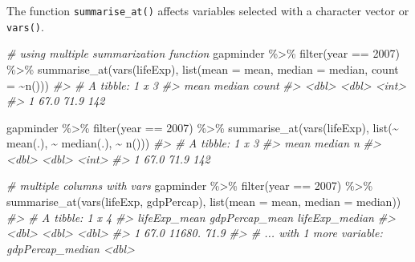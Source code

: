 \documentclass[
]{book}
\newenvironment{Shaded}{\begin{snugshade}}{\end{snugshade}}
\newcommand{\AttributeTok}[1]{\textcolor[rgb]{0.77,0.63,0.00}{#1}}
\newcommand{\CommentTok}[1]{\textcolor[rgb]{0.56,0.35,0.01}{\textit{#1}}}
\newcommand{\DecValTok}[1]{\textcolor[rgb]{0.00,0.00,0.81}{#1}}
\newcommand{\FunctionTok}[1]{\textcolor[rgb]{0.00,0.00,0.00}{#1}}
\newcommand{\NormalTok}[1]{#1}
\newcommand{\SpecialCharTok}[1]{\textcolor[rgb]{0.00,0.00,0.00}{#1}}
\begin{document}
The function \texttt{summarise\_at()} affects variables selected with a character vector or \texttt{vars()}.

\begin{Shaded}
\begin{Highlighting}[]
\CommentTok{\# using multiple summarization function}
\NormalTok{gapminder }\SpecialCharTok{\%\textgreater{}\%}
  \FunctionTok{filter}\NormalTok{(year }\SpecialCharTok{==} \DecValTok{2007}\NormalTok{) }\SpecialCharTok{\%\textgreater{}\%}
  \FunctionTok{summarise\_at}\NormalTok{(}\FunctionTok{vars}\NormalTok{(lifeExp), }\FunctionTok{list}\NormalTok{(}\AttributeTok{mean =}\NormalTok{ mean, }\AttributeTok{median =}\NormalTok{ median, }\AttributeTok{count =} \SpecialCharTok{\textasciitilde{}}\FunctionTok{n}\NormalTok{()))}
\CommentTok{\#\textgreater{} \# A tibble: 1 x 3}
\CommentTok{\#\textgreater{}    mean median count}
\CommentTok{\#\textgreater{}   \textless{}dbl\textgreater{}  \textless{}dbl\textgreater{} \textless{}int\textgreater{}}
\CommentTok{\#\textgreater{} 1  67.0   71.9   142}

\NormalTok{gapminder }\SpecialCharTok{\%\textgreater{}\%}
  \FunctionTok{filter}\NormalTok{(year }\SpecialCharTok{==} \DecValTok{2007}\NormalTok{) }\SpecialCharTok{\%\textgreater{}\%}
  \FunctionTok{summarise\_at}\NormalTok{(}\FunctionTok{vars}\NormalTok{(lifeExp), }\FunctionTok{list}\NormalTok{(}\SpecialCharTok{\textasciitilde{}} \FunctionTok{mean}\NormalTok{(.), }\SpecialCharTok{\textasciitilde{}} \FunctionTok{median}\NormalTok{(.), }\SpecialCharTok{\textasciitilde{}} \FunctionTok{n}\NormalTok{()))}
\CommentTok{\#\textgreater{} \# A tibble: 1 x 3}
\CommentTok{\#\textgreater{}    mean median     n}
\CommentTok{\#\textgreater{}   \textless{}dbl\textgreater{}  \textless{}dbl\textgreater{} \textless{}int\textgreater{}}
\CommentTok{\#\textgreater{} 1  67.0   71.9   142}

\CommentTok{\# multiple columns with vars}
\NormalTok{gapminder }\SpecialCharTok{\%\textgreater{}\%}
  \FunctionTok{filter}\NormalTok{(year }\SpecialCharTok{==} \DecValTok{2007}\NormalTok{) }\SpecialCharTok{\%\textgreater{}\%}
  \FunctionTok{summarise\_at}\NormalTok{(}\FunctionTok{vars}\NormalTok{(lifeExp, gdpPercap), }\FunctionTok{list}\NormalTok{(}\AttributeTok{mean =}\NormalTok{ mean, }\AttributeTok{median =}\NormalTok{ median))}
\CommentTok{\#\textgreater{} \# A tibble: 1 x 4}
\CommentTok{\#\textgreater{}   lifeExp\_mean gdpPercap\_mean lifeExp\_median}
\CommentTok{\#\textgreater{}          \textless{}dbl\textgreater{}          \textless{}dbl\textgreater{}          \textless{}dbl\textgreater{}}
\CommentTok{\#\textgreater{} 1         67.0         11680.           71.9}
\CommentTok{\#\textgreater{} \# ... with 1 more variable: gdpPercap\_median \textless{}dbl\textgreater{}}


\end{Highlighting}
\end{Shaded}
\end{document}
